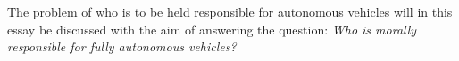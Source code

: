 The problem of who is to be held responsible for autonomous vehicles will in this essay be discussed with the aim of answering the question:
\textit{Who is morally responsible for fully autonomous vehicles?}
